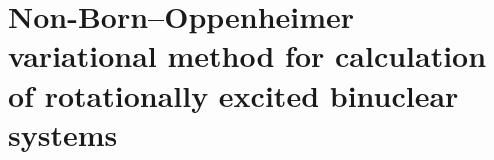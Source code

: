 \chapter{Non-Born–Oppenheimer variational method for calculation of rotationally excited binuclear systems\label{apndx14}}



